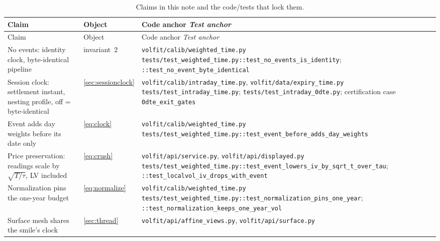 \documentclass[11pt]{article}
\begin{document}
\begingroup
\small
\setlength{\tabcolsep}{4pt}
\renewcommand{\arraystretch}{1.15}
\begin{longtable}{@{}p{}p{}p{}@{}}
\caption{Claims in this note and the code/tests that lock them.}
\label{tab:trace}\\
\toprule Claim & Object & Code anchor \newline \emph{Test anchor}\\ \midrule
\endfirsthead
\toprule Claim & Object & Code anchor \newline \emph{Test anchor}\\ \midrule
\endhead
No events: identity clock, byte-identical pipeline &
invariant~2 &
\nolinkurl{volfit/calib/weighted_time.py}\newline
\nolinkurl{tests/test_weighted_time.py::test_no_events_is_identity};
\nolinkurl{::test_no_event_byte_identical}\\
\addlinespace
Session clock: settlement instant, nesting profile, off = byte-identical &
\cref{sec:sessionclock} &
\nolinkurl{volfit/calib/intraday_time.py},
\nolinkurl{volfit/data/expiry_time.py}\newline
\nolinkurl{tests/test_intraday_time.py};
\nolinkurl{tests/test_intraday_0dte.py};
certification case \texttt{0dte\_exit\_gates}\\
\addlinespace
Event adds day weights before its date only &
\eqref{eq:clock} &
\nolinkurl{volfit/calib/weighted_time.py}\newline
\nolinkurl{tests/test_weighted_time.py::test_event_before_adds_day_weights}\\
\addlinespace
Price preservation: readings scale by $\sqrt{T/\tau}$, LV included &
\eqref{eq:crush} &
\nolinkurl{volfit/api/service.py},
\nolinkurl{volfit/api/displayed.py}\newline
\nolinkurl{tests/test_weighted_time.py::test_event_lowers_iv_by_sqrt_t_over_tau};
\nolinkurl{::test_localvol_iv_drops_with_event}\\
\addlinespace
Normalization pins the one-year budget &
\eqref{eq:normalize} &
\nolinkurl{volfit/calib/weighted_time.py}\newline
\nolinkurl{tests/test_weighted_time.py::test_normalization_pins_one_year};
\nolinkurl{::test_normalization_keeps_one_year_vol}\\
\addlinespace
Surface mesh shares the smile's clock &
\cref{sec:thread} &
\nolinkurl{volfit/api/affine_views.py},
\nolinkurl{volfit/api/surface.py}\newline

\end{longtable}
\end{document}
